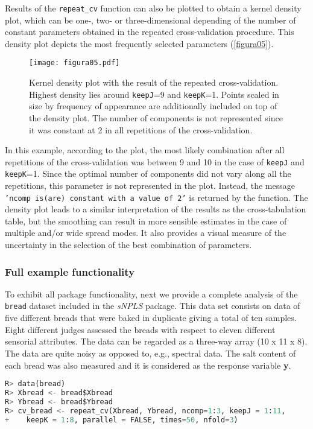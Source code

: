 Results of the \texttt{repeat\_cv} function can also be plotted to obtain a kernel density plot, which can be one-, two- or three-dimensional depending of the number of constant parameters obtained in the repeated cross-validation procedure. This density plot depicts the most frequently selected parameters (\autoref{figura05}). 
\vspace{10pt}
\begin{figure}[hbtp]
	\centering
\texttt{[image: figura05.pdf]}
\caption[Kernel density plot with the results of repeated cross-validation]{Kernel density plot with the result of the repeated cross-validation. Highest density lies around \texttt{keepJ}=9 and \texttt{keepK}=1. Points scaled in size by frequency of appearance are additionally included on top of the density plot. The number of components is not represented since it was constant at 2 in all repetitions of the cross-validation.}
\label{figura05}
\end{figure}

In this example, according to the plot, the most likely combination after all repetitions of the cross-validation was between 9 and 10 in the case of \texttt{keepJ} and \texttt{keepK}=1. Since the optimal number of components did not vary along all the repetitions, this parameter is not represented in the plot. Instead, the message \texttt{'ncomp is(are) constant with a value of 2'} is returned by the function. The density plot leads to a similar interpretation of the results as the cross-tabulation table, but the smoothing can result in more sensible estimates in the case of multiple and/or wide spread modes. It also provides a visual measure of the uncertainty in the selection of the best combination of parameters.

\subsubsection{Full example functionality}
To exhibit all package functionality, next we provide a complete analysis of the \texttt{bread} dataset \parencite{bro1998multi} included in the \textit{sNPLS} package. This data set consists on data of five different breads that were baked in duplicate giving a total of ten samples. Eight different judges assessed the breads with respect to eleven different sensorial attributes. The data can be regarded as a three-way array (10 x 11 x 8). The data are quite noisy as opposed to, e.g., spectral data. The salt content of each bread was also measured and it is considered as the response variable \textbf{y}.
\vspace{15pt}
\begin{lstlisting}[basicstyle=\small, language=Python, morekeywords={data, repeat_cv}]
R> data(bread)
R> Xbread <- bread$Xbread
R> Ybread <- bread$Ybread
R> cv_bread <- repeat_cv(Xbread, Ybread, ncomp=1:3, keepJ = 1:11,   
+    keepK = 1:8, parallel = FALSE, times=50, nfold=3)
\end{lstlisting}

